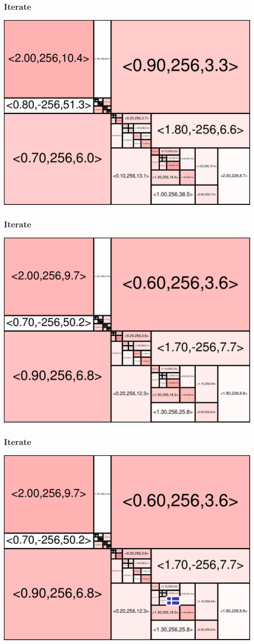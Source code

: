 \begin{frame}
\frametitle{Iterate}\begin{centering}\includegraphics[width=8.5 cm]{remy-graph/graph/test72.pdf}

\end{centering}\end{frame}


\begin{frame}
\frametitle{Iterate}\begin{centering}\includegraphics[width=8.5 cm]{remy-graph/graph/test73.pdf}

\end{centering}\end{frame}


\begin{frame}
\frametitle{Iterate}\begin{centering}\includegraphics[width=8.5 cm]{remy-graph/graph/test74.pdf}

\end{centering}\end{frame}


